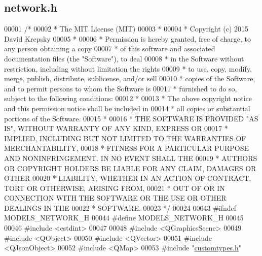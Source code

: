\hypertarget{network_8h_source}{}\subsection{network.\+h}
\label{network_8h_source}

\begin{DoxyCode}
00001 \textcolor{comment}{/*}
00002 \textcolor{comment}{ * The MIT License (MIT)}
00003 \textcolor{comment}{ *}
00004 \textcolor{comment}{ * Copyright (c) 2015 David Krepsky}
00005 \textcolor{comment}{ *}
00006 \textcolor{comment}{ * Permission is hereby granted, free of charge, to any person obtaining a copy}
00007 \textcolor{comment}{ * of this software and associated documentation files (the "Software"), to deal}
00008 \textcolor{comment}{ * in the Software without restriction, including without limitation the rights}
00009 \textcolor{comment}{ * to use, copy, modify, merge, publish, distribute, sublicense, and/or sell}
00010 \textcolor{comment}{ * copies of the Software, and to permit persons to whom the Software is}
00011 \textcolor{comment}{ * furnished to do so, subject to the following conditions:}
00012 \textcolor{comment}{ *}
00013 \textcolor{comment}{ * The above copyright notice and this permission notice shall be included in}
00014 \textcolor{comment}{ * all copies or substantial portions of the Software.}
00015 \textcolor{comment}{ *}
00016 \textcolor{comment}{ * THE SOFTWARE IS PROVIDED "AS IS", WITHOUT WARRANTY OF ANY KIND, EXPRESS OR}
00017 \textcolor{comment}{ * IMPLIED, INCLUDING BUT NOT LIMITED TO THE WARRANTIES OF MERCHANTABILITY,}
00018 \textcolor{comment}{ * FITNESS FOR A PARTICULAR PURPOSE AND NONINFRINGEMENT. IN NO EVENT SHALL THE}
00019 \textcolor{comment}{ * AUTHORS OR COPYRIGHT HOLDERS BE LIABLE FOR ANY CLAIM, DAMAGES OR OTHER}
00020 \textcolor{comment}{ * LIABILITY, WHETHER IN AN ACTION OF CONTRACT, TORT OR OTHERWISE, ARISING FROM,}
00021 \textcolor{comment}{ * OUT OF OR IN CONNECTION WITH THE SOFTWARE OR THE USE OR OTHER DEALINGS IN THE}
00022 \textcolor{comment}{ * SOFTWARE.}
00023 \textcolor{comment}{ */}
00024 
00043 \textcolor{preprocessor}{#ifndef MODELS\_NETWORK\_H}
00044 \textcolor{preprocessor}{#define MODELS\_NETWORK\_H}
00045 
00046 \textcolor{preprocessor}{#include <cstdint>}
00047 
00048 \textcolor{preprocessor}{#include <QGraphicsScene>}
00049 \textcolor{preprocessor}{#include <QObject>}
00050 \textcolor{preprocessor}{#include <QVector>}
00051 \textcolor{preprocessor}{#include <QJsonObject>}
00052 \textcolor{preprocessor}{#include <QMap>}
00053 \textcolor{preprocessor}{#include "\hyperlink{customtypes_8h}{customtypes.h}"}

\end{DoxyCode}
